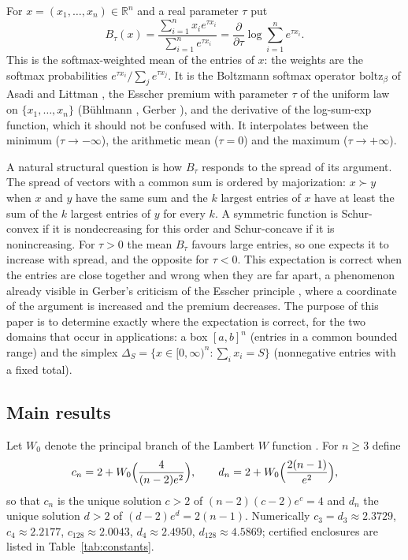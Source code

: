 \documentclass[11pt,a4paper]{article}
\theoremstyle{plain}
\theoremstyle{definition}
\newcommand{\R}{\mathbb{R}}
\newcommand{\Wl}{W_{0}}
\newcommand{\maj}{\succ}
\newcommand{\Simp}{\Delta}
\begin{document}
For $x=(x_1,\dots,x_n)\in\R^n$ and a real parameter $\tau$ put
\begin{equation}\label{eq:softmax-mean}
B_\tau(x)=\frac{\sum_{i=1}^n x_i e^{\tau x_i}}{\sum_{i=1}^n e^{\tau x_i}}
=\frac{\partial}{\partial\tau}\log\sum_{i=1}^n e^{\tau x_i}.
\end{equation}
This is the softmax-weighted mean of the entries of $x$: the weights are the softmax probabilities $e^{\tau x_i}/\sum_j e^{\tau x_j}$. It is the Boltzmann softmax operator $\mathrm{boltz}_\beta$ of Asadi and Littman \cite{AsadiLittman2017}, the Esscher premium with parameter $\tau$ of the uniform law on $\{x_1,\dots,x_n\}$ (B\"uhlmann \cite{Buhlmann1980}, Gerber \cite{Gerber1981}), and the derivative of the log-sum-exp function, which it should not be confused with. It interpolates between the minimum ($\tau\to-\infty$), the arithmetic mean ($\tau=0$) and the maximum ($\tau\to+\infty$).

A natural structural question is how $B_\tau$ responds to the spread of its argument. The spread of vectors with a common sum is ordered by majorization: $x\maj y$ when $x$ and $y$ have the same sum and the $k$ largest entries of $x$ have at least the sum of the $k$ largest entries of $y$ for every $k$. A symmetric function is Schur-convex if it is nondecreasing for this order and Schur-concave if it is nonincreasing. For $\tau>0$ the mean $B_\tau$ favours large entries, so one expects it to increase with spread, and the opposite for $\tau<0$. This expectation is correct when the entries are close together and wrong when they are far apart, a phenomenon already visible in Gerber's criticism of the Esscher principle \cite{Gerber1981}, where a coordinate of the argument is increased and the premium decreases. The purpose of this paper is to determine exactly where the expectation is correct, for the two domains that occur in applications: a box $[a,b]^n$ (entries in a common bounded range) and the simplex $\Simp_S=\{x\in[0,\infty)^n:\sum_i x_i=S\}$ (nonnegative entries with a fixed total).

\subsection*{Main results}
Let $\Wl$ denote the principal branch of the Lambert $W$ function \cite{Corless1996}. For $n\ge 3$ define
\begin{equation}\label{eq:constants}
c_n=2+\Wl\Bigl(\frac{4}{(n-2)e^{2}}\Bigr),\qquad d_n=2+\Wl\Bigl(\frac{2(n-1)}{e^{2}}\Bigr),
\end{equation}
so that $c_n$ is the unique solution $c>2$ of $(n-2)(c-2)e^{c}=4$ and $d_n$ the unique solution $d>2$ of $(d-2)e^{d}=2(n-1)$. Numerically $c_3=d_3\approx 2.3729$, $c_4\approx 2.2177$, $c_{128}\approx 2.0043$, $d_4\approx 2.4950$, $d_{128}\approx 4.5869$; certified enclosures are listed in Table~\ref{tab:constants}.
\end{document}
